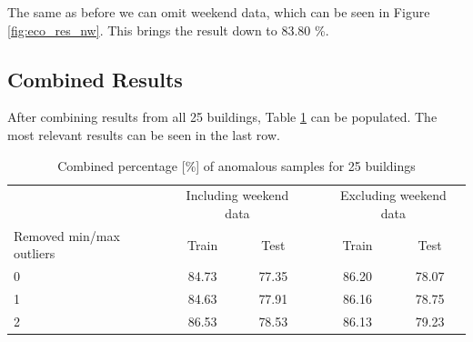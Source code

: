 The same as before we can omit weekend data, which can be seen in Figure \ref{fig:eco_res_nw}. This brings the result down to 83.80 \%. 

\subsection{Combined Results}

After combining results from all 25 buildings, Table \ref{tab:ec_res} can be populated.
The most relevant results can be seen in the last row.

\begin{table}[htbp]
    \centering
    \caption{Combined percentage [\%] of anomalous samples for 25 buildings}
    \label{tab:ec_res}
    \begin{tabular}{lccccc}
        \hline
         & \multicolumn{2}{c}{Including weekend data} && \multicolumn{2}{c}{Excluding weekend data} \\
        \cline{2-3} \cline{5-6}
        Removed min/max outliers & Train & Test && Train & Test \\
        \hline
        0 & 84.73 & 77.35 && 86.20 & 78.07 \\
        1 & 84.63 & 77.91 && 86.16 & 78.75 \\
        2 & 86.53 & 78.53 && 86.13 & 79.23 \\
        \hline
    \end{tabular}
\end{table}

